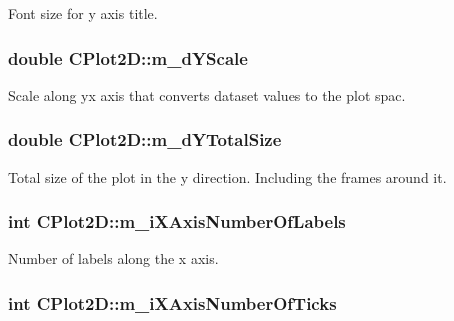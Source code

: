 Font size for y axis title. \hypertarget{class_c_plot2_d_ac38a423e9916689e412bbb2bad4ee487}{
\subsubsection[{m\-\_\-d\-Y\-Scale}]{\setlength{\rightskip}{0pt plus 5cm}double C\-Plot2\-D\-::m\-\_\-d\-Y\-Scale\hspace{0.3cm}{\ttfamily [protected]}}}\label{class_c_plot2_d_ac38a423e9916689e412bbb2bad4ee487}
Scale along yx axis that converts dataset values to the plot spac. \hypertarget{class_c_plot2_d_ac91d1e4488ee754c6695c4882b8ffe47}{
\subsubsection[{m\-\_\-d\-Y\-Total\-Size}]{\setlength{\rightskip}{0pt plus 5cm}double C\-Plot2\-D\-::m\-\_\-d\-Y\-Total\-Size\hspace{0.3cm}{\ttfamily [protected]}}}\label{class_c_plot2_d_ac91d1e4488ee754c6695c4882b8ffe47}
Total size of the plot in the y direction. Including the frames around it. \hypertarget{class_c_plot2_d_a36eefc31bcf98ba9b90817d6d5ec8667}{
\subsubsection[{m\-\_\-i\-X\-Axis\-Number\-Of\-Labels}]{\setlength{\rightskip}{0pt plus 5cm}int C\-Plot2\-D\-::m\-\_\-i\-X\-Axis\-Number\-Of\-Labels\hspace{0.3cm}{\ttfamily [protected]}}}\label{class_c_plot2_d_a36eefc31bcf98ba9b90817d6d5ec8667}
Number of labels along the x axis. \hypertarget{class_c_plot2_d_a89e9d691cf26e50bb3e534173bfbc569}{
\subsubsection[{m\-\_\-i\-X\-Axis\-Number\-Of\-Ticks}]{\setlength{\rightskip}{0pt plus 5cm}int C\-Plot2\-D\-::m\-\_\-i\-X\-Axis\-Number\-Of\-Ticks\hspace{0.3cm}{\ttfamily [protected]}}}\label{class_c_plot2_d_a89e9d691cf26e50bb3e534173bfbc569}
